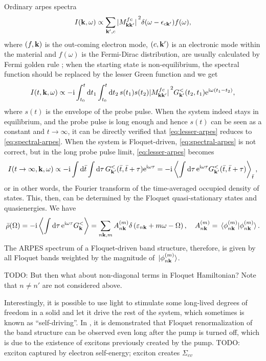 \documentclass[hyperref, a4paper]{article}
\newcommand*{\ii}{\mathrm{i}}
\newcommand*{\ee}{\mathrm{e}}
\begin{document}
Ordinary \ac{arpes} spectra 
\begin{equation}
    I(\vb{k}, \omega) \propto \sum_{\vb{k}', c} 
    \abs*{M_{\vb{k} \vb{k}'}^{fc}}^2 \delta(\omega - \epsilon_{c \vb{k}'}) f(\omega),
    \label{eq:spectral-arpes}
\end{equation}
where $(f, \vb{k})$ is the out-coming electron mode, 
$(c, \vb{k}')$ is an electronic mode within the material 
and $f(\omega)$ is the Fermi-Dirac distribution,
are usually calculated by Fermi golden rule \cite{sobota2021angle};
when the starting state is non-equilibrium, 
the spectral function should be replaced by the lesser Green function 
and we get \cite{freericks2009theoretical,rustagi2018photoemission,chan2023giant}
\begin{equation}
    I(t, \vb{k}, \omega) \propto - \ii \int_{t_0}^t \dd{t_1} \int_{t_0}^t \dd{t_2} s(t_1) s(t_2) 
    \abs*{M_{\vb{k} \vb{k}'}^{fc}}^2 G^<_{\vb{k}'}(t_2, t_1) \ee^{\ii \omega (t_1 - t_2)} ,
    \label{eq:lesser-arpes}
\end{equation}
where $s(t)$ is the envelope of the probe pulse.
When the system indeed stays in equilibrium, 
and the probe pulse is long enough and 
hence $s(t)$ can be seen as a constant and $t \to \infty$, 
it can be directly verified that \eqref{eq:lesser-arpes} reduces to \eqref{eq:spectral-arpes}.
When the system is Floquet-driven, \eqref{eq:spectral-arpes} is not correct, 
but in the long probe pulse limit, \eqref{eq:lesser-arpes} becomes 
\begin{equation}
    I(t \to \infty, \vb{k}, \omega) \propto
    - \ii \int \dd{\bar{t}} \int \dd{\tau} G^<_{\vb{k}'}(\bar{t}, \bar{t} + \tau) \ee^{\ii \omega \tau} 
    = - \ii \expval{\int \dd{\tau} \ee^{\ii \omega \tau}
    G^<_{\vb{k}'}(\bar{t}, \bar{t} + \tau)}_{\bar{t}},
\end{equation} 
or in other words, the Fourier transform of the time-averaged occupied density of states.
This, then, can be determined by the Floquet quasi-stationary states and quasienergies.
We have \cite{rudner2020floquet}
\begin{equation}
    \bar{\rho}(\Omega) = - \ii \expval{\int \dd{\tau} \ee^{\ii \omega \tau} G^<_{\vb{k}}} 
    =\sum_{n \vb{k}, m} A_{n \vb{k}}^{(m)} \delta\left(\varepsilon_{n \vb{k}} +m \omega-\Omega\right), 
    \quad A_{n \vb{k}}^{(m)}= \braket*{\phi_{n \vb{k}}^{(m)}}{\phi_{n \vb{k}}^{(m)}}.
\end{equation}
The ARPES spectrum of a Floquet-driven band structure, therefore, 
is given by all Floquet bands weighted by the magnitude of $\ket*{\phi_{n \vb{k}}^{(m)}}$.

TODO: But then what about non-diagonal terms in Floquet Hamiltonian? Note that $n \neq n'$ are not considered above.

Interestingly, it is possible to use light to stimulate 
some long-lived degrees of freedom in a solid 
and let it drive the rest of the system, 
which sometimes is known as ``self-driving''.
In \cite{chan2023giant}, it is demonstrated that 
Floquet renormalization of the band structure can be observed 
even long after the pump is turned off, 
which is due to the existence of excitons previously created by the pump.
TODO: exciton captured by electron self-energy; 
exciton creates $\Sigma_{cv}$

\printbibliography
\end{document}

